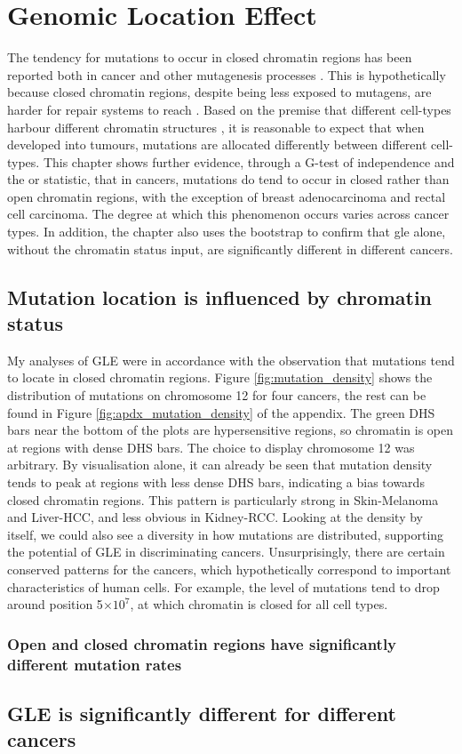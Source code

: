 \chapter{Genomic Location Effect}\label{gle}

The tendency for mutations to occur in closed \gls{chromatin} regions has been reported both in cancer and other mutagenesis processes \citep{Polak2015,Prendergast2007ChromatinGenome}. This is hypothetically because closed chromatin regions, despite being less exposed to mutagens, are harder for repair systems to reach \citep{Prendergast2007ChromatinGenome,Teng1997ExcisionSequences, Morse2002PhotoreactivationCerevisiae}. Based on the premise that different cell-types harbour different chromatin structures \citep{Kundaje2015IntegrativeEpigenomes}, it is reasonable to expect that when developed into tumours, mutations are allocated differently between different cell-types. This chapter shows further evidence, through a G-test of independence and the \gls{or} statistic, that in cancers, mutations do tend to occur in closed rather than open chromatin regions, with the exception of breast adenocarcinoma and rectal cell carcinoma. The degree at which this phenomenon occurs varies across cancer types. In addition, the chapter also uses the \gls{bootstrap} to confirm that \gls{gle} alone, without the chromatin status input, are significantly different in different cancers. 

\section{Mutation location is influenced by chromatin status}
My analyses of GLE were in accordance with the observation that mutations tend to locate in closed chromatin regions. Figure \ref{fig:mutation_density} shows the distribution of mutations on chromosome 12 for four cancers, the rest can be found in Figure \ref{fig:apdx_mutation_density} of the appendix. The green DHS bars near the bottom of the plots are hypersensitive regions, so chromatin is open at regions with dense DHS bars. The choice to display chromosome 12 was arbitrary. By visualisation alone, it can already be seen that mutation density tends to peak at regions with less dense DHS bars, indicating a bias towards closed chromatin regions. This pattern is particularly strong in Skin-Melanoma and Liver-HCC, and less obvious in Kidney-RCC. Looking at the density by itself, we could also see a diversity in how mutations are distributed, supporting the potential of GLE in discriminating cancers. Unsurprisingly, there are certain conserved patterns for the cancers, which hypothetically correspond to important characteristics of human cells. For example, the level of mutations tend to drop around position 5$\times 10^7$, at which chromatin is closed for all cell types.  



\subsection{Open and closed chromatin regions have significantly different mutation rates}




\section{GLE is significantly different for different cancers}